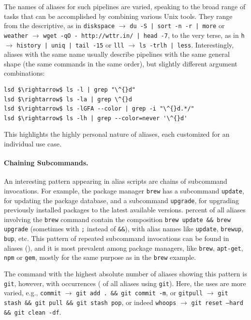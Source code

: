 \documentclass[smallextended,natbib]{svjour3}
\newcommand{\num}[1]{\numprint{#1}}
\newcommand{\per}[1]{\numprint[\%]{#1}}
\newcommand{\alias}[2]{{\texttt{#1} $\rightarrow$ \texttt{#2}}}
\newcommand{\cmd}[1]{{\texttt{#1}}}
\begin{document}
The names of aliases for such pipelines are varied, speaking to the broad range of tasks that can be accomplished by combining various Unix tools. They range from the descriptive, as in \alias{diskspace}{du -S | sort -n -r | more} or  \alias{weather}{wget -qO - http://wttr.in/ | head -7}, to the very terse, as in \alias{h}{history | uniq | tail -15} or \alias{lll}{ls -trlh | less}.
Interestingly, aliases with the same name usually describe pipelines with the same general shape (the same commands in the same order), but slightly different argument combinations:
\begin{Verbatim}[commandchars=\\\{\},codes={\catcode`$=3\catcode`^=7}]
lsd $\rightarrow$ ls -l | grep "\^{}d"
lsd $\rightarrow$ ls -la | grep \^{}d
lsd $\rightarrow$ ls -lGFA --color | grep -i "\^{}d.*/"
lsd $\rightarrow$ ls -lh | grep --color=never '\^{}d'
\end{Verbatim}
This highlights the highly personal nature of aliases, each customized for an individual use case.

\paragraph{Chaining Subcommands.}

An interesting pattern appearing in alias scripts are chains of subcommand invocations.
For example, the package manager \cmd{brew} has a subcommand \texttt{update}, for updating the package database, and a subcommand \texttt{upgrade}, for upgrading previously installed packages to the latest available versions.
\per{28.08} percent of all aliases involving the \cmd{brew} command contain the composition \verb|brew update && brew upgrade| (sometimes with \verb|;| instead of \verb|&&|), with alias names like \verb|update|, \verb|brewup|, \verb|bup|, etc.
This pattern of repeated subcommand invocations can be found in \num{22062} aliases (\per{1}), and it is most prevalent among package managers, like \cmd{brew}, \cmd{apt-get}, \cmd{npm} or \cmd{gem}, mostly for the same purpose as in the \cmd{brew} example.

The command with the highest absolute number of aliases showing this pattern is \cmd{git}, however, with \num{12063} occurrences (\per{3.89} of all aliases using \cmd{git}).
Here, the uses are more varied, 
e.g., \alias{commit}{git add . \&\& git commit -m}, 
or \alias{gitpull}{git stash \&\& git pull \&\& git stash pop},
or indeed \alias{whoops}{git reset --hard \&\& git clean -df}.
\end{document}
